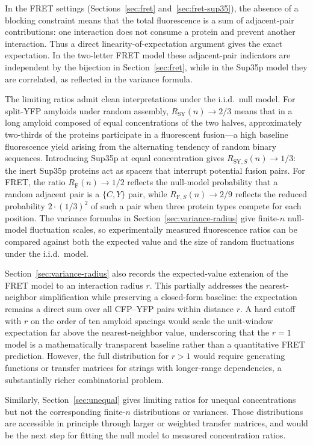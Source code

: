 \documentclass[11pt]{article}
\begin{document}
In the FRET settings (Sections~\ref{sec:fret} and~\ref{sec:fret-sup35}), the absence of a blocking constraint means that the total fluorescence is a sum of adjacent-pair contributions: one interaction does not consume a protein and prevent another interaction. Thus a direct linearity-of-expectation argument gives the exact expectation. In the two-letter FRET model these adjacent-pair indicators are independent by the bijection in Section~\ref{sec:fret}, while in the Sup35p model they are correlated, as reflected in the variance formula.

The limiting ratios admit clean interpretations under the i.i.d.\ null model. For split-YFP amyloids under random assembly, $R_{\text{SY}}(n) \to 2/3$ means that in a long amyloid composed of equal concentrations of the two halves, approximately two-thirds of the proteins participate in a fluorescent fusion---a high baseline fluorescence yield arising from the alternating tendency of random binary sequences. Introducing Sup35p at equal concentration gives $R_{\text{SY},S}(n)\to 1/3$: the inert Sup35p proteins act as spacers that interrupt potential fusion pairs. For FRET, the ratio $R_{\text{F}}(n) \to 1/2$ reflects the null-model probability that a random adjacent pair is a $\{C,Y\}$ pair, while $R_{\text{F},S}(n)\to 2/9$ reflects the reduced probability $2 \cdot (1/3)^2$ of such a pair when three protein types compete for each position. The variance formulas in Section~\ref{sec:variance-radius} give finite-$n$ null-model fluctuation scales, so experimentally measured fluorescence ratios can be compared against both the expected value and the size of random fluctuations under the i.i.d.\ model.

Section~\ref{sec:variance-radius} also records the expected-value extension of the FRET model to an interaction radius $r$. This partially addresses the nearest-neighbor simplification while preserving a closed-form baseline: the expectation remains a direct sum over all CFP--YFP pairs within distance $r$. A hard cutoff with $r$ on the order of ten amyloid spacings would scale the unit-window expectation far above the nearest-neighbor value, underscoring that the $r=1$ model is a mathematically transparent baseline rather than a quantitative FRET prediction. However, the full distribution for $r>1$ would require generating functions or transfer matrices for strings with longer-range dependencies, a substantially richer combinatorial problem.

Similarly, Section~\ref{sec:unequal} gives limiting ratios for unequal concentrations but not the corresponding finite-$n$ distributions or variances. Those distributions are accessible in principle through larger or weighted transfer matrices, and would be the next step for fitting the null model to measured concentration ratios.
\end{document}
